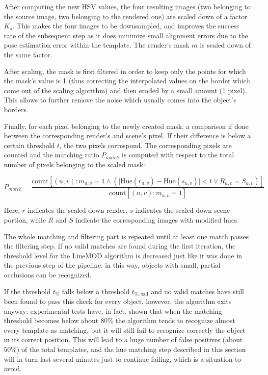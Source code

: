 After computing the new HSV values, the four resulting images (two belonging to
the source image, two belonging to the rendered one) are scaled down of a
factor $K_s$. This makes the four images to be downsampled, and improves the
success rate of the subsequent step as it does minimize small alignment errors
due to the pose estimation error within the template. The render's mask $m$ is
scaled down of the same factor.

After scaling, the mask is first filtered in order to keep only the points for
which the mask's value is 1 (thus correcting the interpolated values on the
border which come out of the scaling algorithm) and then
eroded by a small amount (1 pixel). This allows to further remove the noise
which usually comes into the object's borders.

Finally, for each pixel belonging to the newly created mask, a comparison if
done between the corresponding render's and scene's pixel. If their difference
is below a certain threshold $t$, the two pixels correspond. The corresponding
pixels are counted and the matching ratio $P_{match}$ is computed with respect to the
total number of pixels belonging to the scaled mask:

\begin{equation}
P_{match}=\frac{\text{count}\left[(u,v) : m_{u,v}=1 \wedge \left( \lvert
\text{Hue}(r_{u,v})-\text{Hue}(s_{u,v})\rvert < t \vee R_{u,v}=S_{u,v} \right)
\right]
}{\text{count}\left[ (u,v) : m_{u,v}=1 \right] }
\end{equation}

Here, $r$ indicates the scaled-down render, $s$ indicates the scaled-down scene
portion, while $R$ and $S$ indicate the corresponding images with modified hues.

The whole matching and filtering part is repeated until at least one match
passes the filtering step. If no valid matches are found during the first
iteration, the threshold level for the LineMOD algorithm is decreased
just like it was done in the previous step of the pipeline; in this
way, objects with small, partial occlusions can be recognized.

If the threshold $t_\%$ falls below a threshold $t_{\%,\text{bad}}$
and no valid matches have still been found to pass this check for every object, however, the
algorithm exits anyway: experimental tests have, in fact, shown that
when the matching threshold becomes below about $80\%$ the algorithm
tends to recognize almost every template as matching, but it will
still fail to recognize correctly the object in its correct
position. This will lead to a huge number of false positives (about
$50\%$) of the total templates, and the hue matching step described in
this section will in turn last several minutes just to continue
failing, which is a situation to avoid. 

